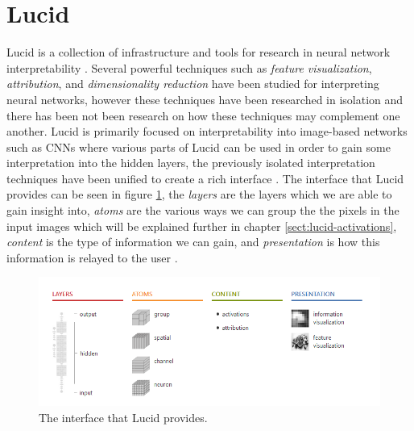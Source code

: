 \section{Lucid}
Lucid is a collection of infrastructure and tools for research in neural network interpretability \cite{Https://github.com/tensorflow/lucid}. Several powerful techniques such as \emph{feature visualization}, \emph{attribution}, and \emph{dimensionality reduction} have been studied for interpreting neural networks, however these techniques have been researched in isolation and there has been not been research on how these techniques may complement one another. Lucid is primarily focused on interpretability into image-based networks such as CNNs where various parts of Lucid can be used in order to gain some interpretation into the hidden layers, the previously isolated interpretation techniques have been unified to create a rich interface \cite{olah2018the}. The interface that Lucid provides can be seen in figure \ref{fig:lucid-summary}, the \emph{layers} are the layers which we are able to gain insight into, \emph{atoms} are the various ways we can group the the pixels in the input images which will be explained further in chapter \ref{sect:lucid-activations}, \emph{content} is the type of information we can gain, and \emph{presentation} is how this information is relayed to the user \cite{olah2018the}. 

\begin  {figure}[!htpb]
  \includegraphics[width=\linewidth]{Evaluation_Images/LUCID_SUM.png}
  \caption{The interface that Lucid provides. \cite{olah2018the}}
  \label{fig:lucid-summary}
\end{figure}



